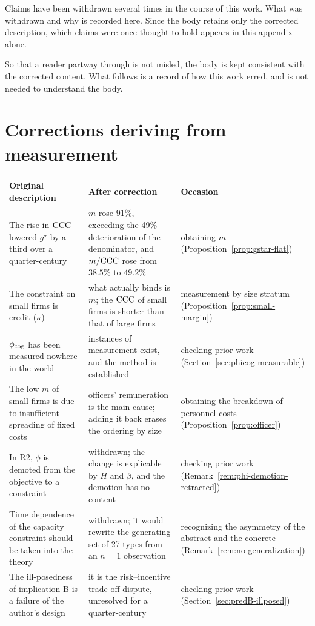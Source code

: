 Claims have been withdrawn several times in the course of this work. What was withdrawn and why is
recorded here. Since the body retains only the corrected description, which claims were once
thought to hold appears in this appendix alone.

So that a reader partway through is not misled, the body is kept consistent with the corrected
content. What follows is a record of how this work erred, and is not needed to understand the
body.

\section{Corrections deriving from measurement}

\begin{center}
\begin{tabularx}{\textwidth}{@{}XXX@{}}
\toprule
Original description & After correction & Occasion \\
\midrule
The rise in $\mathrm{CCC}$ lowered $g^\star$ by a third over a quarter-century
& $m$ rose 91\%, exceeding the 49\% deterioration of the denominator, and $m/\mathrm{CCC}$ rose from $38.5\%$ to $49.2\%$
& obtaining $m$ (Proposition~\ref{prop:gstar-flat}) \\
\addlinespace
The constraint on small firms is credit ($\kappa$)
& what actually binds is $m$; the $\mathrm{CCC}$ of small firms is shorter than that of large firms
& measurement by size stratum (Proposition~\ref{prop:small-margin}) \\
\addlinespace
$\phi_{\rm cog}$ has been measured nowhere in the world
& instances of measurement exist, and the method is established
& checking prior work (Section~\ref{sec:phicog-measurable}) \\
\addlinespace
The low $m$ of small firms is due to insufficient spreading of fixed costs
& officers' remuneration is the main cause; adding it back erases the ordering by size
& obtaining the breakdown of personnel costs (Proposition~\ref{prop:officer}) \\
\addlinespace
In R2, $\phi$ is demoted from the objective to a constraint
& withdrawn; the change is explicable by $H$ and $\beta$, and the demotion has no content
& checking prior work (Remark~\ref{rem:phi-demotion-retracted}) \\
\addlinespace
Time dependence of the capacity constraint should be taken into the theory
& withdrawn; it would rewrite the generating set of 27 types from an $n=1$ observation
& recognizing the asymmetry of the abstract and the concrete (Remark~\ref{rem:no-generalization}) \\
\addlinespace
The ill-posedness of implication B is a failure of the author's design
& it is the risk--incentive trade-off dispute, unresolved for a quarter-century
& checking prior work (Section~\ref{sec:predB-illposed}) \\
\bottomrule
\end{tabularx}
\label{tab:measurement-corrections}
\end{center}


